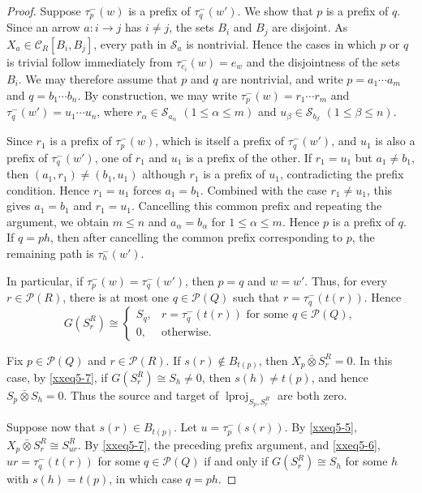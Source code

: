 \documentclass{amsart}
\DeclareMathOperator{\lproj}{lproj}
\newcommand{\btensor}{\mathbin{\bar{\otimes}}}
\theoremstyle{definition}
\theoremstyle{remark}
\numberwithin{equation}{section}
\begin{document}
\begin{proof}
Suppose $\tau_p^-(w)$ is a prefix of $\tau_q^-(w')$.
We show that $p$ is a prefix of $q$.
Since an arrow $a\colon i\to j$ has $i\neq j$, the sets $B_i$ and $B_j$
are disjoint. As $X_a\in\mathcal C_R[B_i,B_j]$, every path in
$\mathcal S_a$ is nontrivial.
Hence the cases in which $p$ or $q$ is trivial follow immediately from
$\tau_{e_i}^-(w)=e_w$ and the disjointness of the sets $B_i$.
We may therefore assume that $p$ and $q$ are nontrivial, and write
$p=a_1\cdots a_m$ and $q=b_1\cdots b_n$.
By construction, we may write
$\tau_p^-(w)=r_1\cdots r_m$ and
$\tau_q^-(w')=u_1\cdots u_n$, where
$r_\alpha\in\mathcal S_{a_\alpha}$ $(1\leq\alpha\leq m)$ and
$u_\beta\in\mathcal S_{b_\beta}$ $(1\leq\beta\leq n)$.

Since $r_1$ is a prefix of $\tau_p^-(w)$, which is itself a prefix of
$\tau_q^-(w')$, and $u_1$ is also a prefix of $\tau_q^-(w')$,
one of $r_1$ and $u_1$ is a prefix of the other.
If $r_1=u_1$ but $a_1\neq b_1$, then $(a_1,r_1)\neq(b_1,u_1)$ although
$r_1$ is a prefix of $u_1$, contradicting the prefix condition.
Hence $r_1=u_1$ forces $a_1=b_1$. Combined with the case $r_1\neq u_1$,
this gives $a_1=b_1$ and $r_1=u_1$.
Cancelling this common prefix and repeating the argument, we obtain
$m\leq n$ and $a_\alpha=b_\alpha$ for $1\leq\alpha\leq m$. Hence $p$ is a prefix of $q$.
If $q=ph$, then after cancelling the common prefix corresponding to
$p$, the remaining path is $\tau_h^-(w')$.

In particular, if $\tau_p^-(w)=\tau_q^-(w')$, then $p=q$ and
$w=w'$. Thus, for every $r\in\mathcal P(R)$, there is at most one
$q\in\mathcal P(Q)$ such that
$r=\tau_q^-(t(r))$.
Hence
\begin{equation}\label{xxeq5-7}
G(S_r^R)
\cong
\begin{cases}
S_q,
&
r=\tau_q^{-}(t(r))
\text{ for some }q\in\mathcal P(Q),
\\
0,
&
\text{otherwise}.
\end{cases}
\end{equation}

Fix $p\in\mathcal P(Q)$ and $r\in\mathcal P(R)$.
If $s(r)\notin B_{t(p)}$, then $X_p\btensor S_r^R=0$.
In this case, by \eqref{xxeq5-7}, if
$G(S_r^R)\cong S_h\neq0$, then
$s(h)\neq t(p)$, and hence $S_p\btensor S_h=0$.
Thus the source and target of
$\lproj_{S_p,S_r^R}$
are both zero.

Suppose now that $s(r)\in B_{t(p)}$.
Let $u=\tau_p^{-}(s(r))$.
By \eqref{xxeq5-5}, $X_p\btensor S_r^R\cong S_{ur}^R$.
By \eqref{xxeq5-7}, the preceding prefix argument, and
\eqref{xxeq5-6}, $ur=\tau_q^{-}(t(r))$
for some $q\in\mathcal P(Q)$ if and only if
$G(S_r^R)\cong S_h$ for some $h$ with $s(h)=t(p)$,
in which case $q=ph$.


\end{proof}
\end{document}
